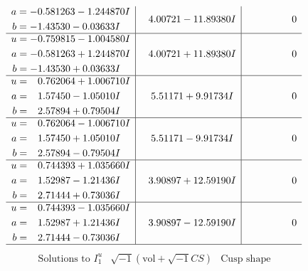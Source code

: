 \documentclass[1p]{elsarticle_modified}
\theoremstyle{definition}
\newcommand{\I}{\sqrt{-1}}
\begin{document}
$$\begin{array}{c|c|c}
\begin{aligned}
a &= -0.581263 - 1.244870 I \\
b &= -1.43530 - 0.03633 I\end{aligned}
 & \phantom{-}4.00721 - 11.89380 I & \phantom{-0.000000 } 0 \\ \hline\begin{aligned}
u &= -0.759815 - 1.004580 I \\
a &= -0.581263 + 1.244870 I \\
b &= -1.43530 + 0.03633 I\end{aligned}
 & \phantom{-}4.00721 + 11.89380 I & \phantom{-0.000000 } 0 \\ \hline\begin{aligned}
u &= \phantom{-}0.762064 + 1.006710 I \\
a &= \phantom{-}1.57450 - 1.05010 I \\
b &= \phantom{-}2.57894 + 0.79504 I\end{aligned}
 & \phantom{-}5.51171 + 9.91734 I & \phantom{-0.000000 } 0 \\ \hline\begin{aligned}
u &= \phantom{-}0.762064 - 1.006710 I \\
a &= \phantom{-}1.57450 + 1.05010 I \\
b &= \phantom{-}2.57894 - 0.79504 I\end{aligned}
 & \phantom{-}5.51171 - 9.91734 I & \phantom{-0.000000 } 0 \\ \hline\begin{aligned}
u &= \phantom{-}0.744393 + 1.035660 I \\
a &= \phantom{-}1.52987 - 1.21436 I \\
b &= \phantom{-}2.71444 + 0.73036 I\end{aligned}
 & \phantom{-}3.90897 + 12.59190 I & \phantom{-0.000000 } 0 \\ \hline\begin{aligned}
u &= \phantom{-}0.744393 - 1.035660 I \\
a &= \phantom{-}1.52987 + 1.21436 I \\
b &= \phantom{-}2.71444 - 0.73036 I\end{aligned}
 & \phantom{-}3.90897 - 12.59190 I & \phantom{-0.000000 } 0\\
 \hline 
 \end{array}$$\newpage$$\begin{array}{c|c|c}  
\text{Solutions to }I^u_{1}& \I (\text{vol} + \sqrt{-1}CS) & \text{Cusp shape}\\
 \hline 
\begin{aligned}

\end{aligned}
\end{array}$$
\end{document}

